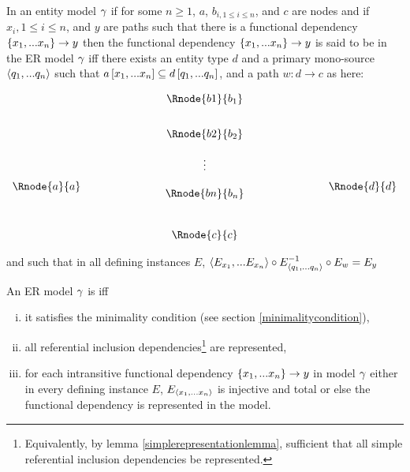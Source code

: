 \begin{definition}
\noindent In an entity model $\gamma$  
if for some $n \geq 1$, $a$, $b_{i, 1 \leq i \leq n}$,  and $c$ are nodes and 
if  $x_{i}, 1 \leq i \leq n$, and $y$ are paths such
that there is a functional dependency $\{x_1,...x_n\} \rightarrow y$
 then the functional dependency $\{x_1,...x_n\} \rightarrow y$ is said to be  in the ER model $\gamma$ iff  there exists an entity type $d$ and a primary mono-source
$\langle q_1,...q_n\rangle$  such that $a\left[x_1,...x_n\right]\subseteq d\left[q_1,...q_n\right]$, and a 
path $w:d\rightarrow c$ as here:

\setlength{\arraycolsep}{.2cm}
\begin{center}
$
\begin{array}{cp{2cm}c p{2cm} c}
             &  & \Rnode{b1}{b_1} & &               \\ [0.7cm]
						 &  & \Rnode{b2}{b_2} & &               \\ [0.4cm]
						 &  &     \vdots      & &               \\ [0.2cm]
\Rnode{a}{a} &  &                 & & \Rnode{d}{d}  \\ [-0.2cm]
             &  & \Rnode{bn}{b_n} & &               \\ [0.9cm]
             &  & \Rnode{c}{c}    & &               \\
\end{array}
$
\end{center}

and such that in all defining instances $E$, 
$\langle E_{x_1},...E_{x_n}\rangle \circ E^{-1}_{\langle q_1,...q_n\rangle}\circ E_w = E_y$
\end{definition}
 
\begin{definition}
\noindent An ER model $\gamma$ is  
 iff 
\begin{enumerate} [(i)]
\item{
it satisfies the minimality condition (see section \ref{minimalitycondition}),
}
\item{ 
all referential inclusion dependencies\footnote{Equivalently, by lemma
\ref{simplerepresentationlemma}, sufficient that all simple referential inclusion dependencies be represented.} are  represented,
}
\item{
for each intransitive functional dependency $\left\{x_1,...x_n\right\} \rightarrow y$ in model $\gamma$
either in every defining instance $E$, $E_{\langle x_1,...x_n\rangle}$ is injective and total
or else the functional dependency is represented in the model.
}
\end{enumerate}
\end{definition}


